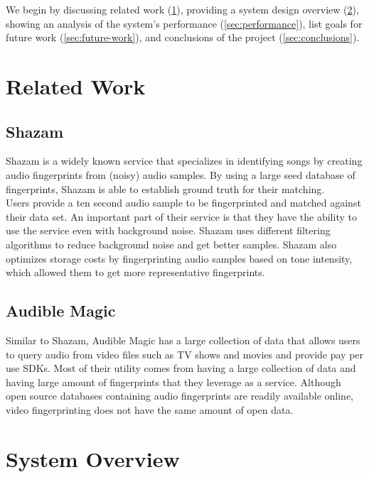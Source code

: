 \documentclass[paper=a4, fontsize=11pt]{scrartcl} %
\numberwithin{equation}{section} %
\numberwithin{figure}{section} %
\numberwithin{table}{section} %
\begin{document}
We begin by discussing related work (\ref{sec:related-work}), providing a system design overview (\ref{sec:system-overview}), showing an analysis of the system's performance (\ref{sec:performance}), list goals for future work (\ref{sec:future-work}), and conclusions of the project (\ref{sec:conclusions}).

\section{Related Work}
\label{sec:related-work}

\subsection{Shazam}
\label{sec:shazam}

Shazam is a widely known service that specializes in identifying songs by creating audio fingerprints from (noisy) audio samples. By using a large seed database of fingerprints, Shazam is able to establish ground truth for their matching. \\

Users provide a ten second audio sample to be fingerprinted and matched against their data set. An important part of their service is that they have the ability to use the service even with background noise. Shazam uses different filtering algorithms to reduce background noise and get better samples. Shazam also optimizes storage costs by fingerprinting audio samples based on tone intensity, which allowed them to get more representative fingerprints. \\

\subsection{Audible Magic}
\label{sec:audible-magic}

Similar to Shazam, Audible Magic has a large collection of data that allows users to query audio from video files such as TV shows and movies and provide pay per use SDKs. Most of their utility comes from having a large collection of data and having large amount of fingerprints that they leverage as a service. Although open source databases containing audio fingerprints are readily available online, video fingerprinting does not have the same amount of open data. \\

\section{System Overview}
\label{sec:system-overview}
\end{document}
